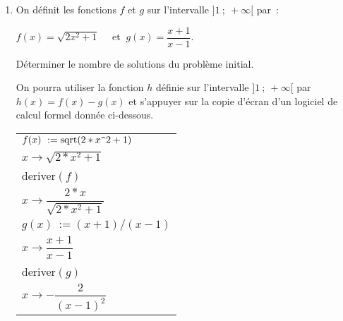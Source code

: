 \begin{enumerate}
\begin{enumerate}[label=\alph*.]
     \end{enumerate}
     \item On définit les fonctions $f$ et $g$ sur l'intervalle $]1~;~+ \infty[$ par~:
\begin{center}
$f(x) = \sqrt{2x^2 + 1}\quad$ et $\: g(x) = \dfrac{x + 1}{x - 1}.$
\end{center}
     Déterminer le nombre de solutions du problème initial.
     \par
     On pourra utiliser la fonction $h$ définie sur l'intervalle $]1~;~+ \infty[$ par $h(x) = f(x) - g(x)$ et s'appuyer sur la copie d'écran d'un logiciel de calcul formel donnée ci-dessous.
     \begin{center}
  \begin{extern}%
  \renewcommand{\arraystretch}{1.5}
          \begin{tabular}{|l|}
          \hline
               $f(x)~:= \text{sqrt}(2*x\verb+^+2+1)$	\\
               \hspace{1.5cm}$x \to  \sqrt{2*x^2+1}$	\\ \hline
               deriver$(f)$							\\ 
               \hspace{1.5cm}$x \to \dfrac{2*x}{\sqrt{2*x^2+ 1}}$ \\[0.3cm] \hline
               $g(x)~:=(x+1)/(x-1)$					\\
               \hspace{1.5cm}$x \to \dfrac{x + 1}{x - 1}$ \\[0.2cm] \hline
               deriver$(g)$							\\ 
               \hspace{1.5cm}$x \to  - \dfrac{2}{(x - 1)^2}$ \\[0.2cm] \hline
          \end{tabular}
  \end{extern}
     \end{center}

\end{enumerate}

